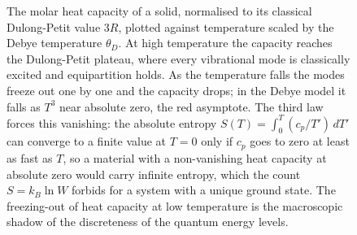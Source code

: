 \begin{figure}[htbp]
\centering
{}
\caption[Heat capacity vanishing as the third law requires]{The molar heat
capacity of a solid, normalised to its classical Dulong-Petit value $3R$, plotted
against temperature scaled by the Debye temperature $\theta_D$. At high
temperature the capacity reaches the Dulong-Petit plateau, where every vibrational
mode is classically excited and equipartition holds. As the temperature falls the
modes freeze out one by one and the capacity drops; in the Debye model it falls as
$T^3$ near absolute zero, the red asymptote. The third law forces this vanishing:
the absolute entropy $S(T) = \int_0^T (c_p/T')\,dT'$ can converge to a finite
value at $T=0$ only if $c_p$ goes to zero at least as fast as $T$, so a material
with a non-vanishing heat capacity at absolute zero would carry infinite entropy,
which the count $S = k_B \ln W$ forbids for a system with a unique ground state.
The freezing-out of heat capacity at low temperature is the macroscopic shadow of
the discreteness of the quantum energy levels.}
\label{fig:vol04ch04:third-law-cp}
\end{figure}
